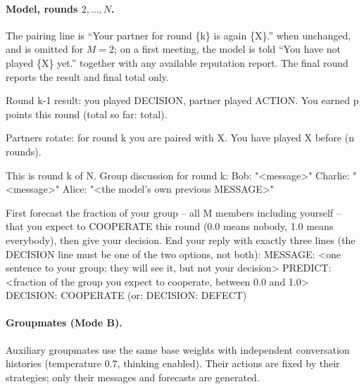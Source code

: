 \documentclass{article}
\begin{document}
\paragraph{Model, rounds $2,\dots,N$.}
The pairing line is ``Your partner for round \{k\} is again \{X\}.'' when
unchanged, and is omitted for $M=2$; on a first meeting, the model is told
``You have not played \{X\} yet.'' together with any available reputation
report. The final round reports the result and final total only.

\begin{modelprompt}
Round {k-1} result: you played {DECISION}, {partner} played {ACTION}. You earned {p}
points this round (total so far: {total}).

Partners rotate: for round {k} you are paired with {X}. You have played {X} before
({n} rounds).

This is round {k} of {N}. Group discussion for round {k}:
  Bob: "<message>"
  Charlie: "<message>"
  Alice: "<the model's own previous MESSAGE>"

First forecast the fraction of your group -- all {M} members including yourself -- that
you expect to COOPERATE this round (0.0 means nobody, 1.0 means everybody), then give
your decision.
End your reply with exactly three lines (the DECISION line must be one of the two
options, not both):
  MESSAGE: <one sentence to your group; they will see it, but not your decision>
  PREDICT: <fraction of the group you expect to cooperate, between 0.0 and 1.0>
  DECISION: COOPERATE          (or: DECISION: DEFECT)
\end{modelprompt}


\paragraph{Groupmates (Mode B).}
Auxiliary groupmates use the same base weights with independent conversation
histories (temperature $0.7$, thinking enabled). Their actions are fixed by
their strategies; only their messages and forecasts are generated.
\end{document}
